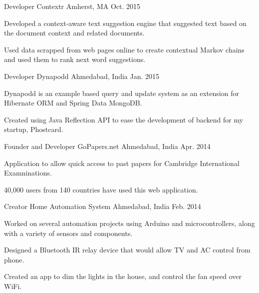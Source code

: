 \begin{cventries}
  \cventry
    {Developer} %
    {Contextr} %
    {Amherst, MA} %
    {Oct. 2015} %
    {
      \begin{cvitems} %
        \item Developed a context-aware text suggestion engine that suggested text based on the document context and related documents.
        \item Used data scrapped from web pages online to create contextual Markov chains and used them to rank next word suggestions.
      \end{cvitems}
    }

  \cventry
    {Developer} %
    {Dynapodd} %
    {Ahmedabad, India} %
    {Jan. 2015} %
    {
      \begin{cvitems} %
        \item Dynapodd is an example based query and update system as an extension for Hibernate ORM and Spring Data MongoDB.
        \item Created using Java Reflection API to ease the development of backend for my startup, Phostcard.
      \end{cvitems}
    }

  \cventry
    {Founder and Developer} %
    {GoPapers.net} %
    {Ahmedabad, India} %
    {Apr. 2014} %
    {
      \begin{cvitems} %
        \item Application to allow quick access to past papers for Cambridge International Examninations.
        \item 40,000 users from 140 countries have used this web application.
      \end{cvitems}
    }

  \cventry
    {Creator} %
    {Home Automation System} %
    {Ahmedabad, India} %
    {Feb. 2014} %
    {
      \begin{cvitems} %
        \item Worked on several automation projects using Arduino and microcontrollers, along with a variety of sensors and components.
        \item Designed a Bluetooth IR relay device that would allow TV and AC control from phone.
        \item Created an app to dim the lights in the house, and control the fan speed over WiFi.
      \end{cvitems}
    }

\end{cventries}
